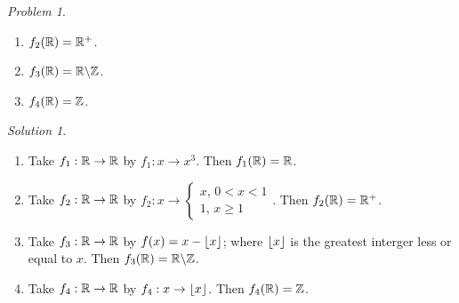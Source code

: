 \documentclass[12pt]{book}
\newcommand{\com}[2]{#1\backslash#2}
\DeclarePairedDelimiter\floor{\lfloor}{\rfloor}
\theoremstyle{plain}
\theoremstyle{plain} %
\theoremstyle{definition}
\theoremstyle{remark}
\newtheorem*{problem}{Problem}
\newtheorem*{solution}{Solution}
\begin{document}
\begin{enumerate}
\begin{problem}
\begin{enumerate}[label=(\arabic*)]
                        \item $f_2(\mathbb{R})=\mathbb{R}^+$.

                        \item $f_3(\R)=\com{\R}{\Z}$.

                        \item $f_4(\mathbb{R})=\mathbb{Z}$.
                    \end{enumerate}
            \end{problem}
            \begin{solution}
                \begin{enumerate}[label=(\arabic*)]
                    \item Take $f_1:\mathbb{R} \rightarrow \mathbb{R}$ by $ f_1:x \rightarrow x^3$. Then $ f_1(\mathbb{R})=\mathbb{R}$.		

                    \item Take $ f_2:\mathbb{R} \rightarrow \mathbb{R}$ by $f_2:x \rightarrow \begin{cases}
                                                    x \text{, } 0 < x < 1 \\
                                                    1 \text{, } x \geq 1
                                              \end{cases}$.
                        Then $ f_2(\mathbb{R})=\mathbb{R}^+$.

                    \item Take $ f_3:\mathbb{R} \rightarrow \mathbb{R}$ by $f(x)=x-\floor{x}$; where $\floor{x}$ is the
                      greatest interger less or equal to $x$. Then  $ f_3(\R)=\com{\R}{\Z}$.

                    \item Take $ f_4:\mathbb{R} \rightarrow \mathbb{R}$ by $ f_4:x \rightarrow \floor{x}$. Then $ f_4(\mathbb{R})=\mathbb{Z}$.
                \end{enumerate}
            \end{solution}

\end{enumerate}
\end{document}

